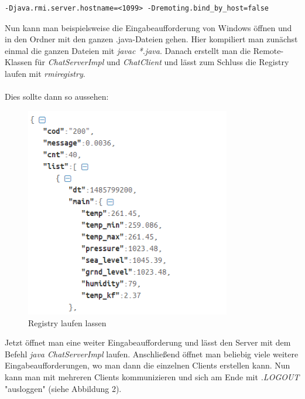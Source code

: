 \begin{lstlisting}
-Djava.rmi.server.hostname=<1099> -Dremoting.bind_by_host=false
\end{lstlisting}


Nun kann man beispielsweise die Eingabeaufforderung von Windows öffnen und in den Ordner mit den ganzen .java-Dateien gehen. Hier kompiliert man zunächst einmal die ganzen Dateien mit \textit{javac *.java}. Danach erstellt man die Remote-Klassen für \textit{ChatServerImpl} und \textit{ChatClient} und lässt zum Schluss die Registry laufen mit \textit{rmiregistry}. \\
\\ 
Dies sollte dann so aussehen:

\begin{figure}[htbp]
\begin{center}
\includegraphics[width=0.8\textwidth]{Bild1}
\caption{Registry laufen lassen}
\end{center}
\end{figure}

Jetzt öffnet man eine weiter Eingabeaufforderung und lässt den Server mit dem Befehl \textit{java ChatServerImpl} laufen. Anschließend öffnet man beliebig viele weitere Eingabeaufforderungen, wo man dann die einzelnen Clients erstellen kann. Nun kann man mit mehreren Clients kommunizieren und sich am Ende mit \textit{.LOGOUT} "ausloggen" (siehe Abbildung 2).  \\
\\

